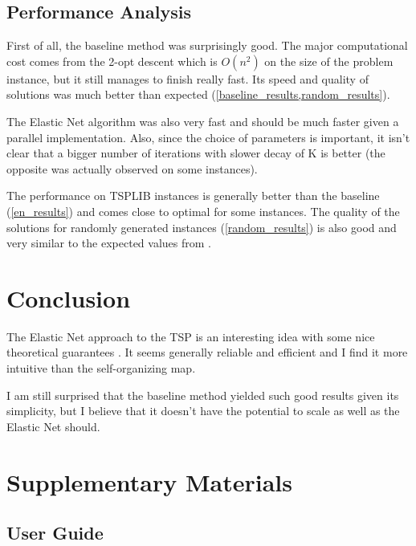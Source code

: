 \documentclass{article} %
\begin{document}
\subsection{Performance Analysis}

First of all, the baseline method was surprisingly good. The major computational cost comes from the 2-opt descent which is $O(n^2)$ on the size of the problem instance, but it still manages to finish really fast. Its speed and quality of solutions was much better than expected (\cref{baseline_results,random_results}).\newline


The Elastic Net algorithm was also very fast and should be much faster given a parallel implementation. Also, since the choice of parameters is important, it isn't clear that a bigger number of iterations with slower decay of K is better (the opposite was actually observed on some instances).

The performance on TSPLIB instances is generally better than the baseline (\cref{en_results}) and comes close to optimal for some instances.
The quality of the solutions for randomly generated instances (\cref{random_results}) is also good and very similar to the expected values from \citep{potvin_ann}.




\section{Conclusion}
\label{conclusion}

The Elastic Net approach to the TSP is an interesting idea with some nice theoretical guarantees \citep{en_theoretical_analysis}. It seems generally reliable and efficient and I find it more intuitive than the self-organizing map.\newline


I am still surprised that the baseline method yielded such good results given its simplicity, but I believe that it doesn't have the potential to scale as well as the Elastic Net should.







\newpage
\section{Supplementary Materials}

\subsection{User Guide}
\label{user_guide}
\end{document}
